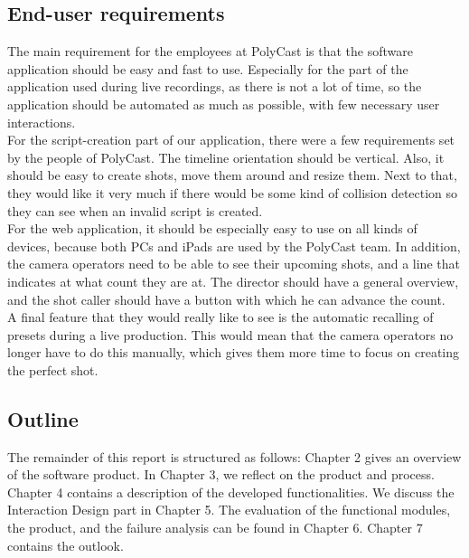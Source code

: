 \subsection{End-user requirements}
The main requirement for the employees at PolyCast is that the software application should be easy and fast to use. Especially for the part of the application used during live recordings, as there is not a lot of time, so the application should be automated as much as possible, with few necessary user interactions.\\
For the script-creation part of our application, there were a few requirements set by the people of PolyCast. The timeline orientation should be vertical. Also, it should be easy to create shots, move them around and resize them. Next to that, they would like it very much if there would be some kind of collision detection so they can see when an invalid script is created.\\
For the web application, it should be especially easy to use on all kinds of devices, because both PCs and iPads are used by the PolyCast team. In addition, the camera operators need to be able to see their upcoming shots, and a line that indicates at what count they are at. The director should have a general overview, and the shot caller should have a button with which he can advance the count.\\
A final feature that they would really like to see is the automatic recalling of presets during a live production. This would mean that the camera operators no longer have to do this manually, which gives them more time to focus on creating the perfect shot.

\subsection{Outline}
The remainder of this report is structured as follows: Chapter 2 gives an overview of the software product. In Chapter 3, we reflect on the product and process. Chapter 4 contains a description of the developed functionalities. We discuss the Interaction Design part in Chapter 5. The evaluation of the functional modules, the product, and the failure analysis can be found in Chapter 6. Chapter 7 contains the outlook.